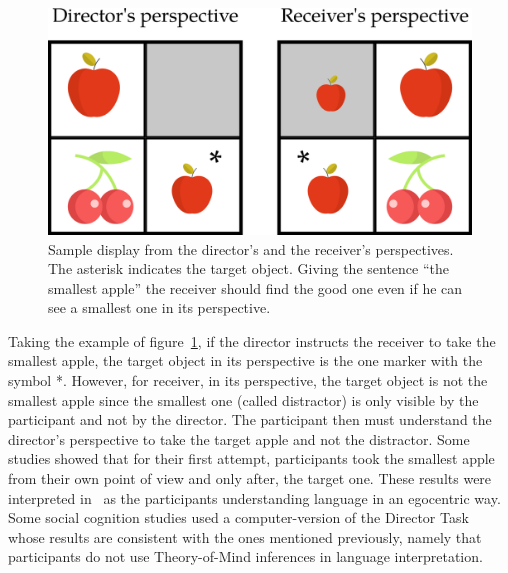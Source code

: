 \begin{figure}[ht!]
\centering
\includegraphics[scale=0.25]{figures/chapter9/dt_apple.png}
\caption{\label{fig:chap9_dt_apple} Sample display from the director's and the receiver's perspectives. The asterisk indicates the target object. Giving the sentence ``the smallest apple'' the receiver should find the good one even if he can see a smallest one in its perspective. }
\end{figure}

Taking the example of figure~\ref{fig:chap9_dt_apple}, if the director instructs the receiver to take the smallest apple, the target object in its perspective is the one marker with the symbol *. However, for receiver, in its perspective, the target object is not the smallest apple since the smallest one (called distractor) is only visible by the participant and not by the director. The participant then must understand the director's perspective to take the target apple and not the distractor. Some studies showed that for their first attempt, participants took the smallest apple from their own point of view and only after, the target one. These results were interpreted in~\cite{keysar_1994_illusory, keysar_1998_egocentric, keysar_2002_self, keysar_2003_limits} as the participants understanding language in an egocentric way. Some social cognition studies used a computer-version of the Director Task~\cite{dumontheil_2010_online} whose results are consistent with the ones mentioned previously, namely that participants do not use Theory-of-Mind inferences in language interpretation.

